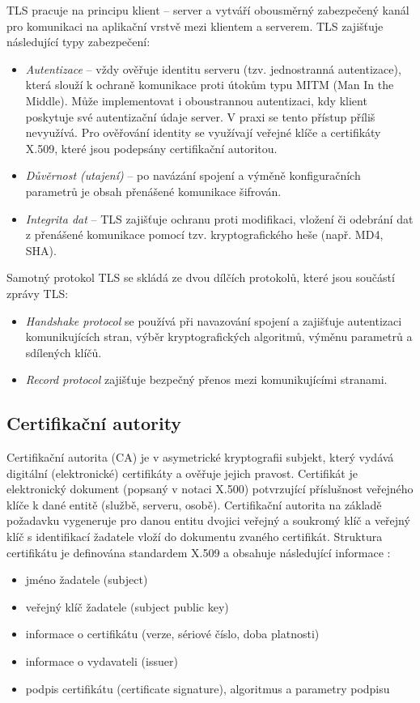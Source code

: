 TLS pracuje na principu klient -- server a vytváří obousměrný zabezpečený kanál pro komunikaci na aplikační vrstvě mezi klientem a serverem. TLS  zajišťuje následující typy zabezpečení:
\begin{itemize}
  \item {\em Autentizace} -- vždy ověřuje identitu serveru (tzv. jednostranná autentizace), která slouží k ochraně komunikace proti útokům typu MITM (Man In the Middle). Může implementovat i oboustrannou autentizaci, kdy klient poskytuje své autentizační údaje server. V praxi se tento přístup příliš nevyužívá. Pro ověřování identity se využívají veřejné klíče a certifikáty X.509, které jsou podepsány certifikační autoritou. 
  \item {\em Důvěrnost (utajení)} -- po navázání spojení a výměně konfiguračních parametrů je obsah přenášené komunikace šifrován. 
  \item {\em Integrita dat} -- TLS zajišťuje ochranu proti modifikaci, vložení či odebrání dat z přenášené komunikace pomocí tzv. kryptografického heše (např. MD4, SHA). 
\end{itemize}

Samotný protokol TLS se skládá ze dvou dílčích protokolů, které jsou součástí zprávy TLS:
\begin{itemize}
  \item \emph{Handshake protocol} se používá při navazování spojení a zajišťuje autentizaci komunikujících stran, výběr kryptografických algoritmů, výměnu parametrů a sdílených klíčů.
  \item \emph{Record protocol} zajišťuje bezpečný přenos mezi komunikujícími stranami.
\end{itemize}

\subsection{Certifikační autority}
Certifikační autorita (CA) je v asymetrické kryptografii subjekt, který vydává digitální (elektronické) certifikáty a ověřuje jejich pravost. Certifikát je elektronický dokument (popsaný v notaci X.500)  potvrzující příslušnost veřejného klíče k dané entitě (službě, serveru, osobě). Certifikační autorita na základě požadavku vygeneruje pro danou entitu dvojici veřejný a soukromý klíč a veřejný klíč s identifikací žadatele vloží do dokumentu zvaného certifikát. Struktura certifikátu je definována standardem X.509 a obsahuje následující informace \cite{rfc5280}:
\begin{itemize}
  \item jméno žadatele (subject)
  \item veřejný klíč žadatele (subject public key)
  \item informace o certifikátu (verze, sériové číslo, doba platnosti)
  \item informace o vydavateli (issuer)
  \item podpis certifikátu (certificate signature), algoritmus a parametry podpisu
\end{itemize}

